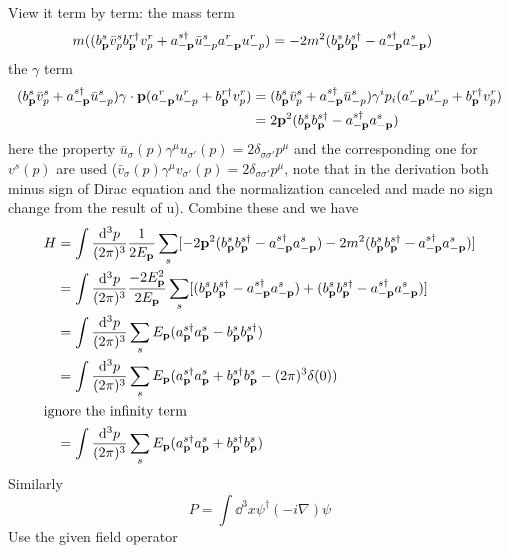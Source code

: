 \documentclass{article}
\newcommand{\gm}{\gamma^{\mu}}
\newcommand{\g}{\gamma}
\newcommand{\s}{\sigma}
\begin{document}
View it term by term:
the mass term
\begin{align*}
  m((b^s_{\vb{p}}\bar v^s_pb^{r\dagger}_{\vb{p}}v^r_{p}+a^{s\dagger}_{-\vb{p}}\bar u^s_{-p}a^r_{\vb{-p}}u^r_{-p})&=-2m^2(b^s_{\vb{p}}b^{s\dagger}_{\vb{p}}-a^{s\dagger}_{-\vb{p}}a^s_{\vb{-p}})
\end{align*}
the $\g$ term
\begin{align*}
  (b^s_{\vb{p}}\bar v^s_p+a^{s\dagger}_{-\vb{p}}\bar u^s_{-p})\g\cdot\vb{p}(a^r_{\vb{-p}}u^r_{-p}+b^{r\dagger}_{\vb{p}}v^r_{p})&=(b^s_{\vb{p}}\bar v^s_p+a^{s\dagger}_{-\vb{p}}\bar u^s_{-p})\g^ip_i(a^r_{\vb{-p}}u^r_{-p}+b^{r\dagger}_{\vb{p}}v^r_{p})\\
  &=2\vb{p}^2(b^s_{\vb{p}}b^{s\dagger}_{\vb{p}}-a^{s\dagger}_{-\vb{p}}a^s_{\vb{-p}})
\end{align*}
here the property $\bar u_{\s}(p)\gm u_{\s'}(p)=2\delta_{\s\s'}p^{\mu}$ and the corresponding one for $v^s(p)$ are used ($\bar v_{\s}(p)\gm v_{\s'}(p)=2\delta_{\s\s'}p^{\mu}$, note that in the derivation both minus sign of Dirac equation and the normalization canceled and made no sign change from the result of u). Combine these and we have
\begin{align*}
  H&=\int\frac{\dd^3p}{(2\pi)^3}\frac{1}{2E_{\vb{p}}}\sum_{s}[-2\vb{p}^2(b^s_{\vb{p}}b^{s\dagger}_{\vb{p}}-a^{s\dagger}_{-\vb{p}}a^s_{\vb{-p}})-2m^2(b^s_{\vb{p}}b^{s\dagger}_{\vb{p}}-a^{s\dagger}_{-\vb{p}}a^s_{\vb{-p}})]\\
  &=\int\frac{\dd^3p}{(2\pi)^3}\frac{-2E_{\vb{p}}^2}{2E_{\vb{p}}}\sum_{s}[(b^s_{\vb{p}}b^{s\dagger}_{\vb{p}}-a^{s\dagger}_{-\vb{p}}a^s_{\vb{-p}})+(b^s_{\vb{p}}b^{s\dagger}_{\vb{p}}-a^{s\dagger}_{-\vb{p}}a^s_{\vb{-p}})]\\ &=\int\frac{\dd^3p}{(2\pi)^3}\sum_{s}E_{\vb{p}}(a^{s\dagger}_{\vb{p}}a^s_{\vb{p}}-b^s_{\vb{p}}b^{s\dagger}_{\vb{p}})\\
  &=\int\frac{\dd^3p}{(2\pi)^3}\sum_{s}E_{\vb{p}}(a^{s\dagger}_{\vb{p}}a^s_{\vb{p}}+b^{s\dagger}_{\vb{p}}b^s_{\vb{p}}-(2\pi)^3\delta(0))\\\intertext{ignore the infinity term}
  &=\int\frac{\dd^3p}{(2\pi)^3}\sum_{s}E_{\vb{p}}(a^{s\dagger}_{\vb{p}}a^s_{\vb{p}}+b^{s\dagger}_{\vb{p}}b^s_{\vb{p}})
\end{align*}
Similarly
$$P=\int\dd^3x\psi^{\dagger}(-i\nabla)\psi$$
Use the given field operator
\end{document}
